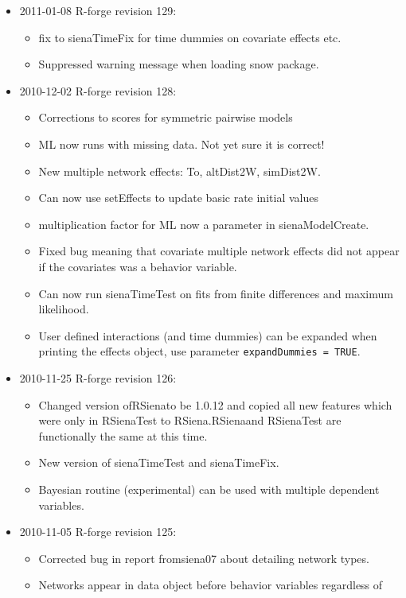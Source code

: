 \documentclass[a4paper,fleqn,11pt]{article}
\newcommand{\+}{\, + \,}
\begin{document}
\begin{small}
\begin{itemize}
\begin{itemize}
\end{itemize}
\item 2011-01-08  R-forge revision 129:
\begin{itemize}
\item fix to sienaTimeFix for time dummies on
  covariate effects etc.
\item Suppressed warning message when loading snow package.
\end{itemize}
\item 2010-12-02 R-forge revision 128:
\begin{itemize}
\item Corrections to scores for symmetric pairwise models
\item ML now runs with missing data. Not yet sure it is correct!
\item New multiple network effects: To, altDist2W, simDist2W.
\item Can now use setEffects to update basic rate initial values
\item multiplication factor for ML now a parameter in sienaModelCreate.
\item Fixed bug meaning that covariate multiple network effects did not appear
  if the covariates was a behavior variable.
\item Can now run \textsf{sienaTimeTest} on fits from finite differences and maximum
  likelihood.
\item User defined interactions (and time dummies) can be expanded
  when printing
  the effects object, use parameter \texttt{expandDummies = TRUE}.
\end{itemize}
\item 2010-11-25 R-forge revision 126:
\begin{itemize}
\item Changed version of\textsf{RSiena}to be 1.0.12 and copied all new features which
  were only in \textsf{RSienaTest} to RSiena.\textsf{RSiena}and \textsf{RSienaTest} are
  functionally the same at this time.
\item New version of \textsf{sienaTimeTest} and \textsf{sienaTimeFix}.
\item Bayesian routine (experimental) can be used with multiple dependent
  variables.
\end{itemize}
\item 2010-11-05 R-forge revision 125:
\begin{itemize}
\item Corrected bug in report from\textsf{siena07} about detailing network types.
\item Networks appear in data object before behavior variables regardless of

\end{itemize}
\end{itemize}
\end{small}
\end{document}
